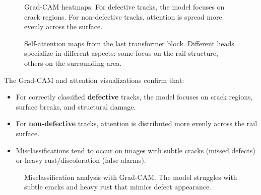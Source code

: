 \documentclass[10pt,twocolumn,letterpaper]{article}
\begin{document}
\begin{figure}[h]
\centering
{}
\caption{Grad-CAM heatmaps. For defective tracks, the model focuses on crack regions. For non-defective tracks, attention is spread more evenly across the surface.}
\label{fig:gradcam}
\end{figure}

\begin{figure}[h]
\centering
{}
\caption{Self-attention maps from the last transformer block. Different heads specialize in different aspects: some focus on the rail structure, others on the surrounding area.}
\label{fig:attention}
\end{figure}

The Grad-CAM and attention visualizations confirm that:
\begin{itemize}[leftmargin=*, itemsep=2pt]
    \item For correctly classified \textbf{defective} tracks, the model focuses on crack regions, surface breaks, and structural damage.
    \item For \textbf{non-defective} tracks, attention is distributed more evenly across the rail surface.
    \item Misclassifications tend to occur on images with subtle cracks (missed defects) or heavy rust/discoloration (false alarms).
\end{itemize}

\begin{figure}[h]
\centering
{}
\caption{Misclassification analysis with Grad-CAM. The model struggles with subtle cracks and heavy rust that mimics defect appearance.}
\label{fig:misclass}
\end{figure}
\end{document}
